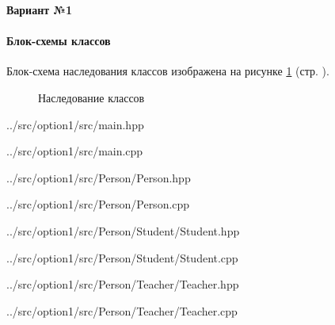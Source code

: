\begin{center}
    \textbf{Вариант №1}
\end{center}

\paragraph{Блок-схемы классов}

Блок-схема наследования классов изображена на рисунке \ref{fig:task-variant-1} (стр. \pageref{fig:task-variant-1}).

\begin{figure}[!htp]
    \caption{Наследование классов}
    \label{fig:task-variant-1}
\end{figure}


{../src/option1/src/main.hpp}


{../src/option1/src/main.cpp}

\newpage


{../src/option1/src/Person/Person.hpp}


{../src/option1/src/Person/Person.cpp}

\newpage


{../src/option1/src/Person/Student/Student.hpp}


{../src/option1/src/Person/Student/Student.cpp}

\newpage


{../src/option1/src/Person/Teacher/Teacher.hpp}


{../src/option1/src/Person/Teacher/Teacher.cpp}

\newpage

